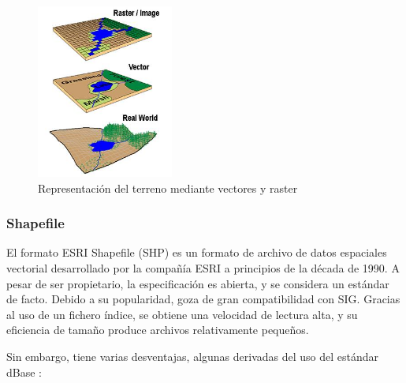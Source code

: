 \begin{figure}[H]
    \includegraphics[width=0.4\textwidth]{images/vector-raster.jpg}
    \centering
    \caption{Representación del terreno mediante vectores y raster}
    \label{fig:vector-raster}
\end{figure}

\subsubsection{Shapefile} El formato ESRI Shapefile (SHP) es un formato de archivo de datos espaciales vectorial
desarrollado por la compañía ESRI a principios de la década de 1990. A pesar de ser propietario, la
especificación es abierta, y se considera un estándar de facto. Debido a su popularidad, goza de gran
compatibilidad con SIG. Gracias al uso de un fichero índice, se obtiene una velocidad de lectura alta, y su
eficiencia de tamaño produce archivos relativamente pequeños.

Sin embargo, tiene varias desventajas, algunas derivadas del uso del estándar dBase \cite{shapefile-specs}
\cite{shapefile-no}: 

